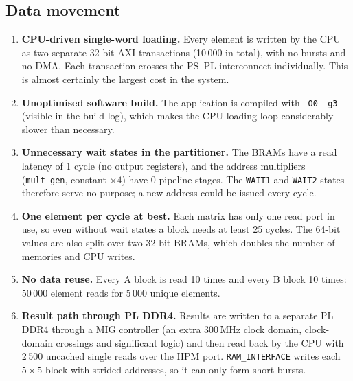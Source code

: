 \documentclass[11pt,a4paper]{article}
\newcommand{\code}[1]{\texttt{#1}}
\begin{document}
\subsection{Data movement}
\begin{enumerate}[label=\textbf{F\arabic*}]
  \item \textbf{CPU-driven single-word loading.} Every element is written by the CPU as two separate 32-bit AXI transactions (10\,000 in total), with no bursts and no DMA. Each transaction crosses the PS--PL interconnect individually. This is almost certainly the largest cost in the system.
  \item \textbf{Unoptimised software build.} The application is compiled with \code{-O0 -g3} (visible in the build log), which makes the CPU loading loop considerably slower than necessary.
  \item \textbf{Unnecessary wait states in the partitioner.} The BRAMs have a read latency of 1 cycle (no output registers), and the address multipliers (\code{mult\_gen}, constant $\times4$) have 0 pipeline stages. The \code{WAIT1} and \code{WAIT2} states therefore serve no purpose; a new address could be issued every cycle.
  \item \textbf{One element per cycle at best.} Each matrix has only one read port in use, so even without wait states a block needs at least 25 cycles. The 64-bit values are also split over two 32-bit BRAMs, which doubles the number of memories and CPU writes.
  \item \textbf{No data reuse.} Every A block is read 10 times and every B block 10 times: 50\,000 element reads for 5\,000 unique elements.
  \item \textbf{Result path through PL DDR4.} Results are written to a separate PL DDR4 through a MIG controller (an extra 300\,MHz clock domain, clock-domain crossings and significant logic) and then read back by the CPU with 2\,500 uncached single reads over the HPM port. \code{RAM\_INTERFACE} writes each $5\times5$ block with strided addresses, so it can only form short bursts.
\end{enumerate}
\end{document}
